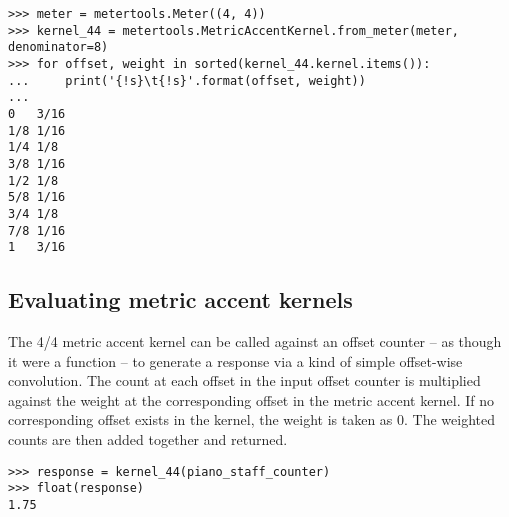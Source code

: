 \begin{singlespacing}
\vspace{-0.5\baselineskip}
\begin{lstlisting}
>>> meter = metertools.Meter((4, 4))
>>> kernel_44 = metertools.MetricAccentKernel.from_meter(meter, denominator=8)
>>> for offset, weight in sorted(kernel_44.kernel.items()):
...     print('{!s}\t{!s}'.format(offset, weight))
...
0	3/16
1/8	1/16
1/4	1/8
3/8	1/16
1/2	1/8
5/8	1/16
3/4	1/8
7/8	1/16
1	3/16
\end{lstlisting}
\end{singlespacing}

\subsection{Evaluating metric accent kernels} %

\noindent The 4/4 metric accent kernel can be called against an offset counter
-- as though it were a function -- to generate a response via a kind of simple
offset-wise convolution. The count at each offset in the input offset counter
is multiplied against the weight at the corresponding offset in the metric
accent kernel. If no corresponding offset exists in the kernel, the weight is
taken as 0. The weighted counts are then added together and returned.

\begin{comment}
<abjad>
response = kernel_44(piano_staff_counter)
float(response)
</abjad>
\end{comment}

\begin{singlespacing}
\vspace{-0.5\baselineskip}
\begin{lstlisting}
>>> response = kernel_44(piano_staff_counter)
>>> float(response)
1.75
\end{lstlisting}
\end{singlespacing}

\begin{comment}
<abjad>
total = Multiplier(0, 1)
for offset, count in sorted(piano_staff_counter.items()):
    weight = Multiplier(0, 1)
    if offset in kernel_44.kernel:
        weight = kernel_44.kernel[offset]
    weighted_count = weight * count
    total += weighted_count
    print(offset, count, weight, weighted_count, total)

</abjad>
\end{comment}

